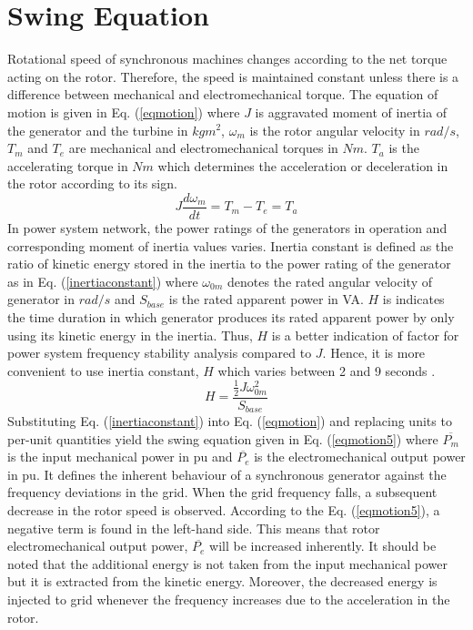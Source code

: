 \section{Swing Equation}
\label{swing}
Rotational speed of synchronous machines changes according to the net torque acting on the rotor. Therefore, the speed is maintained constant unless there is a difference between mechanical and electromechanical torque. The equation of motion is given in Eq. (\ref{eqmotion}) where $J$ is aggravated moment of inertia of the generator and the turbine in $kgm^{2}$, $\omega_{m}$ is the rotor angular velocity in $rad/s$, $T_{m}$ and $T_{e}$ are mechanical and electromechanical torques in $Nm$. $T_{a}$ is the accelerating torque in $Nm$ which determines the acceleration or deceleration in the rotor according to its sign.
\begin{equation}
J\frac{d\omega_{m}}{dt}=T_{m}-T_{e}=T_{a}
\label{eqmotion}
\end{equation}
In power system network, the power ratings of the generators in operation and corresponding moment of inertia values varies. Inertia constant is defined as the ratio of kinetic energy stored in the inertia to the power rating of the generator as in Eq. (\ref{inertiaconstant}) where $\omega_{0m}$ denotes the rated angular velocity of generator in $rad/s$ and $S_{base}$ is the rated apparent power in VA. $H$ is indicates the time duration in which generator produces its rated apparent power by only using its kinetic energy in the inertia. Thus, $H$ is a better indication of factor for power system frequency stability analysis compared to $J$. Hence, it is more convenient to use inertia constant, $H$ which varies between 2 and 9 seconds \cite{Kundur}.
\begin{equation}
H=\frac{{\frac{1}{2}}J\omega_{0m}^{2}}{S_{base}}
\label{inertiaconstant}
\end{equation}
Substituting Eq. (\ref{inertiaconstant}) into Eq. (\ref{eqmotion}) and replacing units to per-unit quantities yield the swing equation given in Eq. (\ref{eqmotion5}) where $\overline{P_{m}}$ is the input mechanical power in pu and $\overline{P_{e}}$ is the electromechanical output power in pu. It defines the inherent behaviour of a synchronous generator against the frequency deviations in the grid. When the grid frequency falls, a subsequent decrease in the rotor speed is observed. According to the Eq. (\ref{eqmotion5}), a negative term is found in the left-hand side. This means that rotor electromechanical output power, $\overline{P_{e}}$ will be increased inherently. It should be noted that the additional energy is not taken from the input mechanical power but it is extracted from the kinetic energy. Moreover, the decreased energy is injected to grid whenever the frequency increases due to the acceleration in the rotor.
